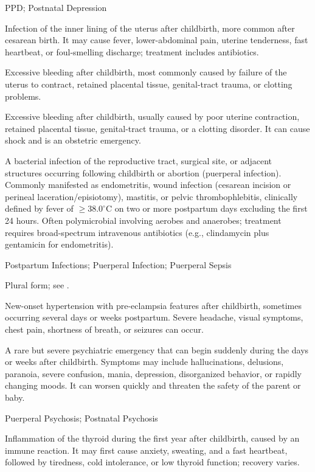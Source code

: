 \synonyms
PPD; Postnatal Depression

 Infection of the inner lining of the uterus after childbirth, more common after cesarean birth. It may cause fever, lower-abdominal pain, uterine tenderness, fast heartbeat, or foul-smelling discharge; treatment includes antibiotics.

 Excessive bleeding after childbirth, most commonly caused by failure of the uterus to contract, retained placental tissue, genital-tract trauma, or clotting problems.

 Excessive bleeding after childbirth, usually caused by poor uterine contraction, retained placental tissue, genital-tract
trauma, or a clotting disorder. It can cause shock and is an obstetric emergency.

 A bacterial infection of the reproductive tract, surgical site, or adjacent structures occurring following childbirth or abortion (puerperal infection). Commonly manifested as endometritis, wound infection (cesarean incision or perineal laceration/episiotomy), mastitis, or pelvic thrombophlebitis, clinically defined by fever of $\ge 38.0^\circ$C on two or more postpartum days excluding the first 24 hours. Often polymicrobial involving aerobes and anaerobes; treatment requires broad-spectrum intravenous antibiotics (e.g., clindamycin plus gentamicin for endometritis).

\synonyms
Postpartum Infections; Puerperal Infection; Puerperal Sepsis

 Plural form; see .

 New-onset hypertension with pre-eclampsia features after childbirth, sometimes occurring several days or weeks postpartum. Severe headache, visual symptoms, chest pain, shortness of breath, or seizures can occur.

 A rare but severe psychiatric emergency that can begin suddenly during the days or weeks after childbirth. Symptoms may include hallucinations, delusions, paranoia, severe confusion, mania, depression, disorganized behavior, or rapidly changing moods. It can worsen quickly and threaten the safety of the parent or baby.

\synonyms
Puerperal Psychosis; Postnatal Psychosis

 Inflammation of the thyroid during the first year after childbirth, caused by an immune reaction. It may first cause anxiety, sweating, and a fast heartbeat, followed by tiredness, cold intolerance, or low thyroid function; recovery varies.

